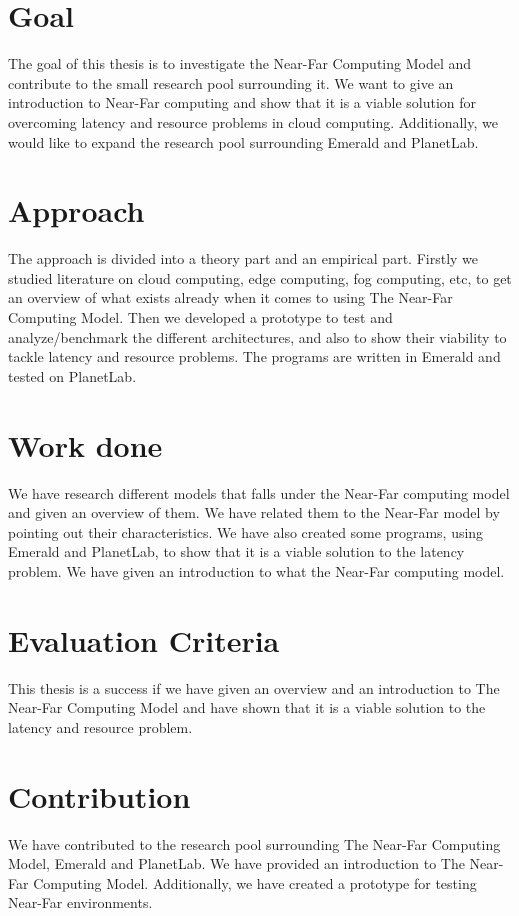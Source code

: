 \section{Goal}
The goal of this thesis is to investigate the Near-Far Computing Model and contribute to the small research pool surrounding it. We want to give an introduction to Near-Far computing and show that it is a viable solution for overcoming latency and resource problems in cloud computing. Additionally, we would like to expand the research pool surrounding Emerald and PlanetLab.

\section{Approach}
The approach is divided into a theory part and an empirical part. Firstly we studied literature on cloud computing, edge computing, fog computing, etc, to get an overview of what exists already when it comes to using The Near-Far Computing Model. Then we developed a prototype to test and analyze/benchmark the different architectures, and also to show their viability to tackle latency and resource problems. The programs are written in Emerald and tested on PlanetLab.


\section{Work done}
We have research different models that falls under the Near-Far computing model and given an overview of them. We have related them to the Near-Far model by pointing out their characteristics. We have also created some programs, using Emerald and PlanetLab, to show that it is a viable solution to the latency problem. We have given an introduction to what the Near-Far computing model.

\section{Evaluation Criteria}
This thesis is a success if we have given an overview and an introduction to The Near-Far Computing Model and have shown that it is a viable solution to the latency and resource problem.

\section{Contribution}
We have contributed to the research pool surrounding The Near-Far Computing Model, Emerald and PlanetLab. We have provided an introduction to The Near-Far Computing Model. Additionally, we have created a prototype for testing Near-Far environments. 

